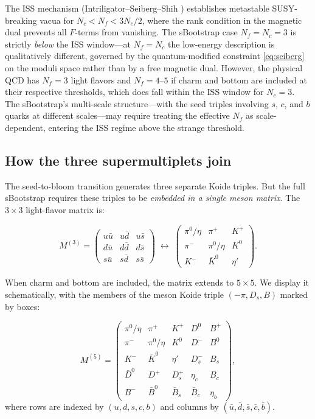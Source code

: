 \documentclass[12pt,a4paper]{article}
\begin{document}
The ISS mechanism (Intriligator--Seiberg--Shih \cite{ISS2006}) 
establishes metastable SUSY-breaking vacua for $N_c < N_f < 3N_c/2$, 
where the rank condition in the magnetic dual prevents all $F$-terms 
from vanishing. The sBootstrap case $N_f = N_c = 3$ is strictly 
\emph{below} the ISS window---at $N_f = N_c$ the low-energy 
description is qualitatively different, governed by the 
quantum-modified constraint \eqref{eq:seiberg} on the moduli space 
rather than by a free magnetic dual. However, the physical QCD has 
$N_f = 3$ light flavors and $N_f = 4$--$5$ if charm and bottom are 
included at their respective thresholds, which does fall within the 
ISS window for $N_c = 3$. The sBootstrap's multi-scale structure---with 
the seed triples involving $s$, $c$, and $b$ quarks at different 
scales---may require treating the effective $N_f$ as 
scale-dependent, entering the ISS regime above the strange threshold.

\subsection{How the three supermultiplets join}

The seed-to-bloom transition generates three separate Koide triples. 
But the full sBootstrap requires these triples to be \emph{embedded 
in a single meson matrix}. The $3\times 3$ light-flavor matrix is:

\begin{equation}
M^{(3)} = \begin{pmatrix}
u\bar{u} & u\bar{d} & u\bar{s} \\
d\bar{u} & d\bar{d} & d\bar{s} \\
s\bar{u} & s\bar{d} & s\bar{s}
\end{pmatrix}
\;\longleftrightarrow\;
\begin{pmatrix}
\pi^0/\eta & \pi^+ & K^+ \\
\pi^- & \pi^0/\eta & K^0 \\
K^- & \bar{K}^0 & \eta'
\end{pmatrix}.
\end{equation}

When charm and bottom are included, the matrix extends to $5\times 5$. 
We display it schematically, with the members of the meson Koide 
triple $(-\pi, D_s, B)$ marked by boxes:

\begin{equation}
M^{(5)} = \begin{pmatrix}
\pi^0/\eta & \boxed{\pi^+} & K^+ & D^0 & \boxed{B^+} \\
\pi^- & \pi^0/\eta & K^0 & D^- & B^0 \\
K^- & \bar{K}^0 & \eta' & \boxed{D_s^-} & B_s \\
\bar{D}^0 & D^+ & D_s^+ & \eta_c & B_c \\
B^- & \bar{B}^0 & \bar{B}_s & \bar{B}_c & \eta_b
\end{pmatrix},
\end{equation}
where rows are indexed by $(u, d, s, c, b)$ and columns by 
$(\bar{u}, \bar{d}, \bar{s}, \bar{c}, \bar{b})$.
\end{document}
